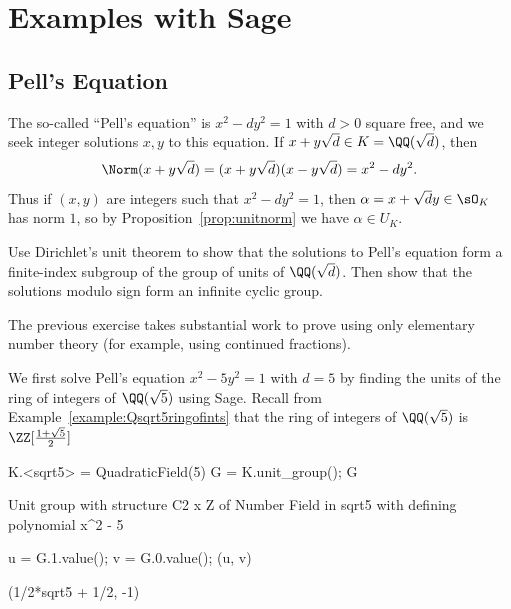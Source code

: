 \section{Examples with Sage}

\subsection{Pell's Equation}\label{sec:pell}

The so-called ``Pell's equation'' is $x^2 - dy^2 = 1$ with $d>0$ square
free, and we seek integer solutions $x,y$ to this equation.
If $x + y\sqrt{d} \in K = \QQ(\sqrt{d})$, then
\[
  \Norm(x+y\sqrt{d}) = (x + y\sqrt{d})(x - y\sqrt{d}) = x^2 -dy^2.
\]
Thus if $(x,y)$ are integers such that $x^2 - d y^2 = 1$, then
$\alpha = x + \sqrt{d}y \in \sO_K$ has norm $1$, so by
Proposition~\ref{prop:unitnorm} we have $\alpha \in U_K$.

\begin{exercise}
  Use Dirichlet's unit theorem to show that the solutions to Pell's equation
  form a finite-index subgroup of the group of units of $\QQ(\sqrt{d})$.
  Then show that the solutions modulo sign form an infinite cyclic group.
\end{exercise}

\begin{remark}
  The previous exercise takes substantial work to prove using only elementary
  number theory (for example, using continued fractions).
\end{remark}

We first solve Pell's equation $x^2 - 5y^2 = 1$ with $d=5$ by finding
the units of the ring of integers of $\QQ(\sqrt{5})$ using Sage.
Recall from Example~\ref{example:Qsqrt5ringofints} that the
ring of integers of $\QQ(\sqrt{5})$ is $\ZZ[\frac{1+\sqrt{5}}{2}]$

\begin{sagecode}
\begin{sagecell}
K.<sqrt5> = QuadraticField(5)
G = K.unit_group(); G
\end{sagecell}
\begin{sageout}
Unit group with structure C2 x Z of Number Field in sqrt5 with
defining polynomial x^2 - 5
\end{sageout}
\begin{sagecell}
u = G.1.value(); v = G.0.value(); (u, v)
\end{sagecell}
\begin{sageout}
(1/2*sqrt5 + 1/2, -1)
\end{sageout}
\end{sagecode} %

